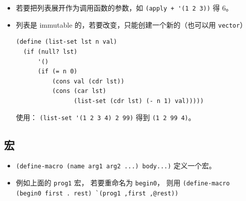 \begin{itemize}
\item 若要把列表展开作为调用函数的参数，如 \verb`(apply + '(1 2 3))` 得 6。
\item 列表是 immutable 的，若要改变，只能创建一个新的（也可以用 \verb`vector`）
\begin{lstlisting}[language=none]
(define (list-set lst n val)
  (if (null? lst)
      '()
      (if (= n 0)
          (cons val (cdr lst))
          (cons (car lst)
                (list-set (cdr lst) (- n 1) val)))))
\end{lstlisting}
使用： \verb`(list-set '(1 2 3 4) 2 99)` 得到 \verb`(1 2 99 4)`。
\end{itemize}


\subsection{宏}
\begin{itemize}
\item \verb`(define-macro (name arg1 arg2 ...) body...)` 定义一个宏。
\item 例如上面的 \verb`prog1` 宏， 若要重命名为 \verb`begin0`， 则用 \verb|(define-macro (begin0 first . rest) `(prog1 ,first ,@rest))|
\end{itemize}

